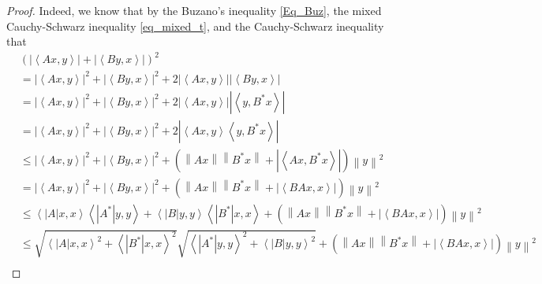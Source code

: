\documentclass[12pt,twoside,reqno]{amsart}
\numberwithin{equation}{section}
\begin{document}
\begin{proof}
Indeed, we know that by the Buzano's inequality \eqref{Eq_Buz}, the mixed Cauchy-Schwarz inequality \eqref{eq_mixed_t}, and the Cauchy-Schwarz inequality that
\begin{align}
  & {{\left( \left| \left\langle Ax,y \right\rangle  \right|+\left| \left\langle By,x \right\rangle  \right| \right)}^{2}} \nonumber\\ 
 & ={{\left| \left\langle Ax,y \right\rangle  \right|}^{2}}+{{\left| \left\langle By,x \right\rangle  \right|}^{2}}+2\left| \left\langle Ax,y \right\rangle  \right|\left| \left\langle By,x \right\rangle  \right| \nonumber\\ 
 & ={{\left| \left\langle Ax,y \right\rangle  \right|}^{2}}+{{\left| \left\langle By,x \right\rangle  \right|}^{2}}+2\left| \left\langle Ax,y \right\rangle  \right|\left| \left\langle y,{{B}^{*}}x \right\rangle  \right| \nonumber\\ 
 & ={{\left| \left\langle Ax,y \right\rangle  \right|}^{2}}+{{\left| \left\langle By,x \right\rangle  \right|}^{2}}+2\left| \left\langle Ax,y \right\rangle \left\langle y,{{B}^{*}}x \right\rangle  \right| \nonumber\\ 
 & \le {{\left| \left\langle Ax,y \right\rangle  \right|}^{2}}+{{\left| \left\langle By,x \right\rangle  \right|}^{2}}+\left( \left\| Ax \right\|\left\| {{B}^{*}}x \right\|+\left| \left\langle Ax,{{B}^{*}}x \right\rangle  \right| \right){{\left\| y \right\|}^{2}} \nonumber\\ 
 & ={{\left| \left\langle Ax,y \right\rangle  \right|}^{2}}+{{\left| \left\langle By,x \right\rangle  \right|}^{2}}+\left( \left\| Ax \right\|\left\| {{B}^{*}}x \right\|+\left| \left\langle BAx,x \right\rangle  \right| \right){{\left\| y \right\|}^{2}} \nonumber\\ 
 & \le \left\langle \left| A \right|x,x \right\rangle \left\langle \left| {{A}^{*}} \right|y,y \right\rangle +\left\langle \left| B \right|y,y \right\rangle \left\langle \left| {{B}^{*}} \right|x,x \right\rangle +\left( \left\| Ax \right\|\left\| {{B}^{*}}x \right\|+\left| \left\langle BAx,x \right\rangle  \right| \right){{\left\| y \right\|}^{2}} \nonumber\\ 
 & \le \sqrt{{{\left\langle \left| A \right|x,x \right\rangle }^{2}}+{{\left\langle \left| {{B}^{*}} \right|x,x \right\rangle }^{2}}}\sqrt{{{\left\langle \left| {{A}^{*}} \right|y,y \right\rangle }^{2}}+{{\left\langle \left| B \right|y,y \right\rangle }^{2}}}+\left( \left\| Ax \right\|\left\| {{B}^{*}}x \right\|+\left| \left\langle BAx,x \right\rangle  \right| \right){{\left\| y \right\|}^{2}} \nonumber\\ 

\end{align}
\end{proof}
\end{document}
